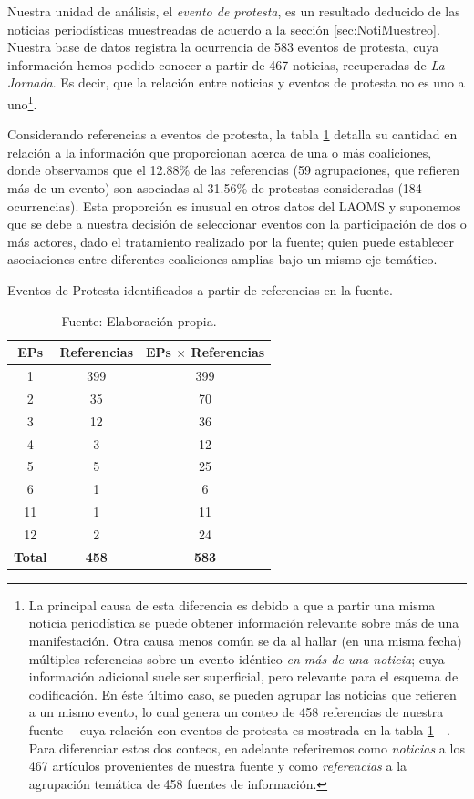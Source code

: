 \documentclass[letterpaper, 11pt]{book}
\theoremstyle{definition}
\theoremstyle{remark}
\begin{document}
Nuestra unidad de análisis, el \emph{evento de protesta}, es un resultado deducido de las noticias periodísticas muestreadas de acuerdo a la sección \ref{sec:NotiMuestreo}. 
Nuestra base de datos registra la ocurrencia de 583 eventos de protesta, cuya información hemos podido conocer a partir de 467 noticias, recuperadas de \emph{La Jornada}. 
Es decir, que la relación entre noticias y eventos de protesta no es uno a uno\footnote{
    La principal causa de esta diferencia es debido a que a partir una misma noticia periodística se puede obtener información relevante sobre más de una manifestación. 
    Otra causa menos común se da al hallar (en una misma fecha) múltiples referencias sobre un evento idéntico \emph{en más de una noticia}; cuya información adicional suele ser superficial, pero relevante para el esquema de codificación. 
    En éste último caso, se pueden agrupar las noticias que refieren a un mismo evento, lo cual genera un conteo de 458 referencias de nuestra fuente ---cuya relación con eventos de protesta es mostrada en la tabla \ref{Relacion_EPs_noticias}---. 
    Para diferenciar estos dos conteos, en adelante referiremos como \emph{noticias} a los 467 artículos provenientes de nuestra fuente y como \emph{referencias} a la agrupación temática de 458 fuentes de información.
}.



Considerando referencias a eventos de protesta, la tabla \ref{Relacion_EPs_noticias} detalla su cantidad en relación a la información que proporcionan acerca de una o más coaliciones, donde observamos que el 12.88\% de las referencias (59 agrupaciones, que refieren más de un evento) son asociadas al 31.56\% de protestas consideradas (184 ocurrencias). 
Esta proporción es inusual en otros datos del LAOMS y suponemos que se debe a nuestra decisión de seleccionar eventos con la participación de dos o más actores, dado el tratamiento realizado por la fuente; quien puede establecer asociaciones entre diferentes coaliciones amplias bajo un mismo eje temático. 


\begin{table}[!hbt]
\center
\small
\caption{Eventos de Protesta identificados a partir de referencias en la fuente.}
\label{Relacion_EPs_noticias}
\begin{tabular}{ | c | c | c | } 
\hline
\textbf{EPs} & \textbf{Referencias} & \textbf{EPs $\times$ Referencias}\\
\hline
1 & 399 & 399\\
\hline
2 & 35 & 70\\
\hline
3 & 12 & 36\\
\hline
4 & 3 & 12\\
\hline
5 & 5 & 25\\
\hline
6 & 1 & 6\\
\hline
11 & 1 & 11\\
\hline
12 & 2 & 24\\
\hline
\textbf{Total} & \textbf{458} & \textbf{583}\\
\hline
\end{tabular}
\par\bigskip
\caption*{\small Fuente: Elaboración propia.}
\end{table}
\end{document}
